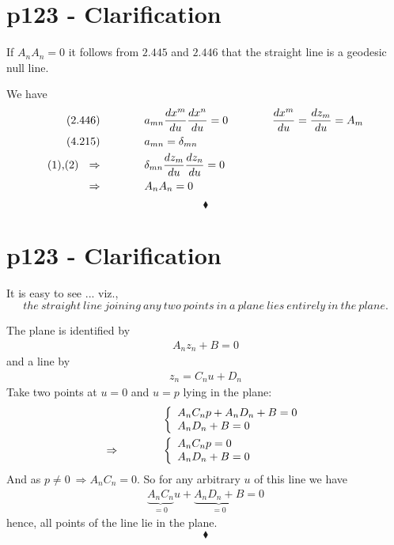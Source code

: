 \section{p123 - Clarification}
\begin{tcolorbox}
If $A_{n}A_{n} =0$ it follows from $\mathbf{2.445}$ and $\mathbf{2.446}$ that the straight line is a geodesic null line.
\end{tcolorbox}
We have 
\begin{align}
\text{(2.446)}\quad\quad\quad\quad & a_{mn}\dv{x^m}{u}\dv{x^n}{u}=0 \quad\quad\quad\quad \dv{x^m}{u}= \dv{z_m}{u} = A_m\\
\text{(4.215)}\quad\quad\quad\quad & a_{mn}=\delta_{mn}\\
\text{(1),(2) \ }\Rightarrow \quad\quad\quad\quad &\delta_{mn}\dv{z_m}{u}\dv{z_n}{u}=0\\
\Rightarrow \quad\quad\quad\quad &A_nA_n=0
\end{align}
$$\blacklozenge$$
\newpage


\section{p123 - Clarification}
\begin{tcolorbox}
It is easy to see ... viz., $$\mathit{the \ straight \ line \ joining \ any \ two \ points \ in \ a \ plane \ lies \ entirely \ in \ the \ plane.}$$ 
\end{tcolorbox}
The plane is identified by 
\begin{align*}
A_n z_n+B=0
\end{align*}
and a line by
\begin{align*}
z_n = C_nu+D_n
\end{align*}
Take two points at $u=0$ and $u=p$ lying in the plane:
\begin{align*}
& \left\{ \begin{array}{l}
A_nC_np+A_nD_n+B=0\\
A_nD_n+B=0
\end{array} \right.\\
\Rightarrow\quad\quad\quad\quad & \left\{ \begin{array}{l}
A_nC_np=0\\
A_nD_n+B=0
\end{array} \right.
\end{align*}
And as $p\neq 0 \ \Rightarrow A_nC_n = 0$. So for any arbitrary $u$ of this line we have
\begin{align*}
\underbrace{A_nC_n}_{=0}u+\underbrace{A_nD_n+B}_{=0}=0
\end{align*}
hence, all points of the line lie in the plane.
$$\blacklozenge$$
\newpage


